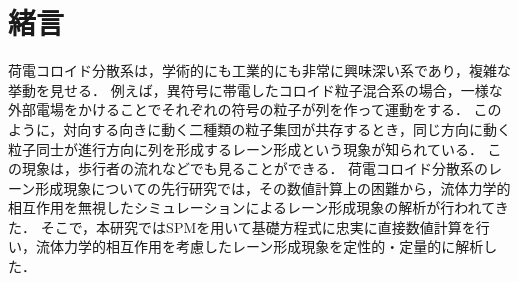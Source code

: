 \section{\large 緒言}
\par 荷電コロイド分散系は，学術的にも工業的にも非常に興味深い系であり，複雑な挙動を見せる．
例えば，異符号に帯電したコロイド粒子混合系の場合，一様な外部電場をかけることでそれぞれの符号の粒子が列を作って運動をする．
このように，対向する向きに動く二種類の粒子集団が共存するとき，同じ方向に動く粒子同士が進行方向に列を形成するレーン形成という現象が知られている．
この現象は，歩行者の流れなどでも見ることができる\cite{pedestrian}．
荷電コロイド分散系のレーン形成現象についての先行研究では，その数値計算上の困難から，流体力学的相互作用を無視したシミュレーションによるレーン形成現象の解析が行われてきた\cite{Teun}．
そこで，本研究ではSPM\cite{spm}を用いて基礎方程式に忠実に直接数値計算を行い，流体力学的相互作用を考慮したレーン形成現象を定性的・定量的に解析した．
